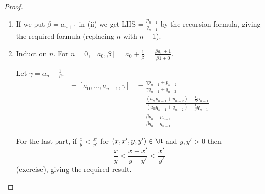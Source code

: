 \documentclass{article}
\begin{document}
\begin{proof}
    \leavevmode
    \begin{enumerate}[label=(\roman*)]
        \item If we put $\beta = a_{n+1}$ in (ii) we get LHS = $\frac{p_{n+1}}{q_{n+1}}$ by the recursion formula, giving the required formula (replacing $n$ with $n+1$).
        \item Induct on $n$. For $n=0$, $[a_0, \beta] = a_0 + \frac{1}{\beta} = \frac{\beta a_0 + 1}{\beta \dot 1 + 0}$.

            Let $\gamma = a_n + \frac{1}{\beta}$.
            \begin{align*}
                [a_0, \dotsc, a_n, \beta] = [a_0, \dotsc, a_{n-1}, \gamma] &= \frac{\gamma p_{n-1} + p_{n-2}}{\gamma q_{n-1} + q_{n-2}} \\
                                                                           &= \frac{(a_n p_{n-1} + p_{n-2}) + \frac{1}{\beta} p_{n-1}}{(a_n q_{n-1} + q_{n-2}) + \frac{1}{\beta} q_{n-1}} \\
                                                                           &= \frac{\beta p_n + p_{n-1}} {\beta q_n + q_{n-1}}
            \end{align*}

            For the last part, if $\frac{x}{y} < \frac{x'}{y'}$ for $(x, x', y, y') \in \R$ and $y, y' > 0$ then
            \begin{equation*}
                \frac{x}{y} < \frac{x+x'}{y+y'} < \frac{x'}{y'}
            \end{equation*}
            (exercise), giving the required result.
    \end{enumerate}
\end{proof}
\end{document}
